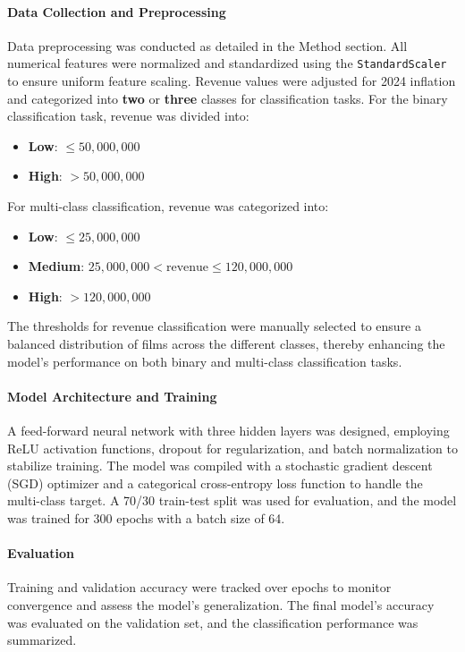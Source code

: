 \documentclass{article}
\begin{document}
\paragraph{Data Collection and Preprocessing}
Data preprocessing was conducted as detailed in the Method section. All numerical features were normalized and standardized using the \texttt{StandardScaler} to ensure uniform feature scaling. Revenue values were adjusted for 2024 inflation and categorized into \textbf{two} or \textbf{three} classes for classification tasks. For the binary classification task, revenue was divided into:
\begin{itemize}
    \item \textbf{Low}: \( \leq 50,000,000 \)
    \item \textbf{High}: \( > 50,000,000 \)
\end{itemize}
For multi-class classification, revenue was categorized into:
\begin{itemize}
    \item \textbf{Low}: \( \leq 25,000,000 \)
    \item \textbf{Medium}: \( 25,000,000 < \text{revenue} \leq 120,000,000 \)
    \item \textbf{High}: \( > 120,000,000 \)
\end{itemize}
The thresholds for revenue classification were manually selected to ensure a balanced distribution of films across the different classes, thereby enhancing the model's performance on both binary and multi-class classification tasks.

\paragraph{Model Architecture and Training}
A feed-forward neural network with three hidden layers was designed, employing ReLU activation functions, dropout for regularization, and batch normalization to stabilize training. The model was compiled with a stochastic gradient descent (SGD) optimizer and a categorical cross-entropy loss function to handle the multi-class target. A 70/30 train-test split was used for evaluation, and the model was trained for 300 epochs with a batch size of 64.

\paragraph{Evaluation}
Training and validation accuracy were tracked over epochs to monitor convergence and assess the model’s generalization. The final model’s accuracy was evaluated on the validation set, and the classification performance was summarized.
\end{document}
